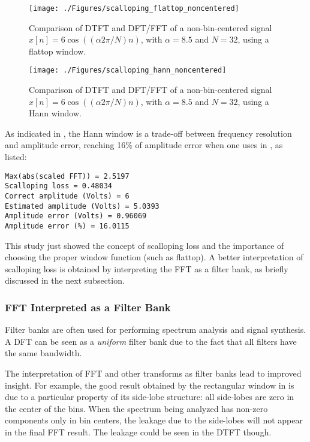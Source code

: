 \begin{figure}[htbp]
\centering
\texttt{[image: ./Figures/scalloping\_flattop\_noncentered]}
\caption{Comparison of DTFT and DFT/FFT of a non-bin-centered signal $x[n]=6\cos((\alpha 2 \pi /N) n)$, with $\alpha=8.5$ and $N=32$, using a flattop window.\label{fig:scalloping_flattop_noncentered}}
\end{figure}

\begin{figure}[htbp]
\centering
\texttt{[image: ./Figures/scalloping\_hann\_noncentered]}
\caption{Comparison of DTFT and DFT/FFT of a non-bin-centered signal $x[n]=6\cos((\alpha 2 \pi /N) n)$, with $\alpha=8.5$ and $N=32$, using a Hann window.\label{fig:scalloping_hann_noncentered}}
\end{figure}

As indicated in , the Hann window is a trade-off between frequency resolution and amplitude error, reaching 16\% of amplitude error when one uses  in , as listed:
\begin{verbatim}
Max(abs(scaled FFT)) = 2.5197
Scalloping loss = 0.48034
Correct amplitude (Volts) = 6
Estimated amplitude (Volts) = 5.0393
Amplitude error (Volts) = 0.96069
Amplitude error (%) = 16.0115
\end{verbatim}

This study just showed the concept of scalloping loss and the importance of choosing the proper window function (such as flattop). 
A better interpretation of scalloping loss is obtained by interpreting the FFT as a filter bank, 
as briefly discussed in the next subsection. %

\subsubsection{FFT Interpreted as a Filter Bank}
\label{sec:fftFilterBank}
Filter banks are often used for performing spectrum analysis and signal synthesis. A DFT can be seen as a \emph{uniform} filter bank due to the fact that all filters have the same bandwidth. 

The interpretation of FFT and other transforms as filter banks lead to improved insight. For example, the good result obtained by the rectangular window in  is due to a particular property of its side-lobe structure: all side-lobes are zero in the center of the bins. When the spectrum being analyzed has non-zero components only in bin centers, the leakage due to the side-lobes will not appear in the final FFT result. The leakage could be seen in the DTFT though.

